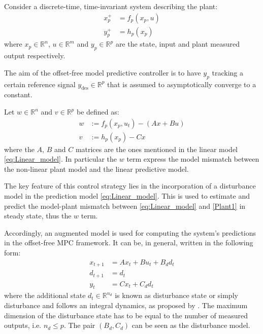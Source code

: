 \documentclass[a4paper,12pt,oneside]{book}
\begin{document}
\bigskip
Consider a discrete-time, time-invariant system describing the plant:
\begin{equation}
\begin{aligned}
    x_p^+ &= f_p (x_p, u) \\
    y_p^+ &= h_p (x_p) 
\end{aligned}
\label{Plant1}
\end{equation}
where $x_p \in \mathbb{R}^n$, $u \in \mathbb{R}^m$ and $y_p \in \mathbb{R}^p$ are the state, input and plant measured output respectively. 

The aim of the offset-free model predictive controller is to have $y_p$ tracking a certain reference signal $y_{\text{des}} \in \mathbb{R}^p$ that is assumed to asymptotically converge to a constant.

\bigskip
Let $w \in \mathbb{R}^n$ and $v \in \mathbb{R}^p$ be defined as:
\begin{equation}
\begin{aligned}
    w & := f_p (x_p, u_t) - (A x + Bu) \\
    v & := h_p (x_p) - C x
\end{aligned}
\label{Plant_model_mismatch}
\end{equation}
where the $A$, $B$ and $C$ matrices are the ones mentioned in the linear model \ref{eq:Linear_model}. In particular the $w$ term express the model mismatch between the non-linear plant model and the linear predictive model.

\bigskip
The key feature of this control strategy lies in the incorporation of a disturbance model in the prediction model \ref{eq:Linear_model}.
This is used to estimate and predict the model-plant mismatch between \ref{eq:Linear_model} and \ref{Plant1} in steady state, thus the $w$ term. 

\bigskip
Accordingly, an augmented model is used for computing the system's predictions in the offset-free MPC framework. 
It can be, in general, written in the following form:
\begin{equation}
\begin{aligned}
    x_{t+1} &= A x_t + B u_t + B_d d_t \\
    d_{t+1} &= d_t \\
    y_t &= C x_t + C_d d_t
\end{aligned}
\label{Augmented_model}
\end{equation}
where the additional state $d_t \in \mathbb{R}^{n_d}$ is known as disturbance state or simply disturbance and follows an integral dynamics, as proposed by \cite{pannocchia2003disturbance}. 
The maximum dimension of the disturbance state has to be equal to the number of measured outputs, i.e. $n_d \leq p$.
The pair $(B_d, C_d)$ can be seen as the disturbance model.
\end{document}

